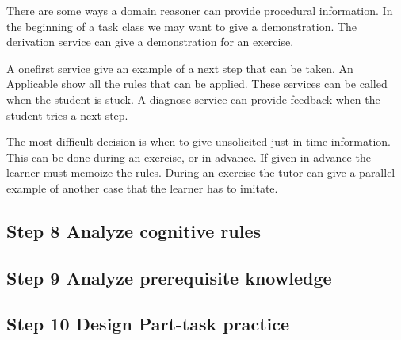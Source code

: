 There are some ways a domain reasoner can provide procedural information.
In the beginning of a task class we may want to give a demonstration. 
The derivation service can give a demonstration for an exercise.

A onefirst service give an example of a next step that can be taken.
An Applicable show all the rules that can be applied.
These services can be called when the student is stuck.
A diagnose service can provide feedback when the student tries a next step.

The most difficult decision is when to give unsolicited just in time information.
This can be done during an exercise, or in advance.
If given in advance the learner must memoize the rules.
During an exercise the tutor can give a parallel example of another case  that the learner has to imitate.



\subsection{Step 8 Analyze cognitive rules}


\subsection{Step 9 Analyze prerequisite knowledge}


\subsection{Step 10 Design Part-task practice}


